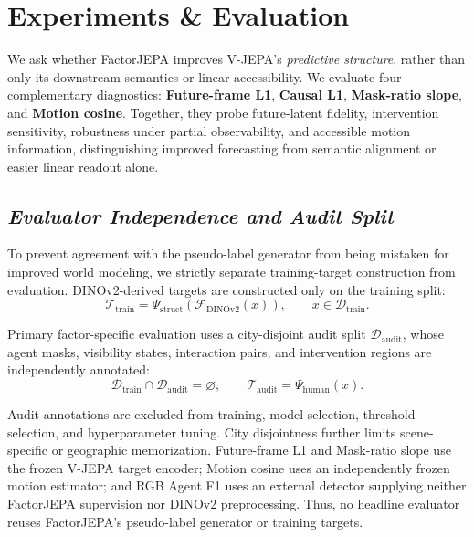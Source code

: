 \section{\textbf{Experiments \& Evaluation}}
\label{sec:experiments}

We ask whether FactorJEPA improves V-JEPA's \emph{predictive structure}, rather
than only its downstream semantics or linear accessibility. We evaluate four
complementary diagnostics: \textbf{Future-frame L1}, \textbf{Causal L1},
\textbf{Mask-ratio slope}, and \textbf{Motion cosine}. Together, they probe
future-latent fidelity, intervention sensitivity, robustness under partial
observability, and accessible motion information, distinguishing improved
forecasting from semantic alignment or easier linear readout alone.

\subsection{\textbf{\emph{Evaluator Independence and Audit Split}}}
\label{sec:evaluator_independence}

To prevent agreement with the pseudo-label generator from being mistaken for
improved world modeling, we strictly separate training-target construction from
evaluation. DINOv2-derived targets are constructed only on the training split:
\begin{equation*}
\mathcal T_{\mathrm{train}}
=
\Psi_{\mathrm{struct}}
\left(
\mathcal F_{\mathrm{DINOv2}}(x)
\right),
\qquad
x\in\mathcal D_{\mathrm{train}}.
\end{equation*}

Primary factor-specific evaluation uses a city-disjoint audit split
$\mathcal D_{\mathrm{audit}}$, whose agent masks, visibility states,
interaction pairs, and intervention regions are independently annotated:
\begin{equation*}
\mathcal D_{\mathrm{train}}
\cap
\mathcal D_{\mathrm{audit}}
=
\varnothing,
\qquad
\mathcal T_{\mathrm{audit}}
=
\Psi_{\mathrm{human}}(x).
\end{equation*}

Audit annotations are excluded from training, model selection, threshold
selection, and hyperparameter tuning. City disjointness further limits
scene-specific or geographic memorization. Future-frame L1 and Mask-ratio slope
use the frozen V-JEPA target encoder; Motion cosine uses an independently
frozen motion estimator; and RGB Agent F1 uses an external detector supplying
neither FactorJEPA supervision nor DINOv2 preprocessing. Thus, no headline
evaluator reuses FactorJEPA's pseudo-label generator or training targets.

